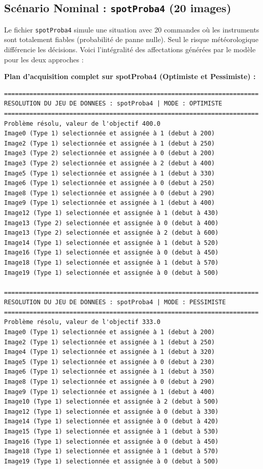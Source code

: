 \documentclass[8pt]{article}
\begin{document}
\subsection{Scénario Nominal : \texttt{spotProba4} (20 images)}

Le fichier \texttt{spotProba4} simule une situation avec 20 commandes où les instruments sont totalement fiables (probabilité de panne nulle). Seul le risque météorologique différencie les décisions. Voici l'intégralité des affectations générées par le modèle pour les deux approches :

\textbf{Plan d'acquisition complet sur spotProba4 (Optimiste et Pessimiste) :}
\begin{verbatim}
======================================================================
RESOLUTION DU JEU DE DONNEES : spotProba4 | MODE : OPTIMISTE
======================================================================
Problème résolu, valeur de l'objectif 400.0
Image0 (Type 1) selectionnée et assignée à 1 (debut à 200)
Image2 (Type 1) selectionnée et assignée à 1 (debut à 250)
Image3 (Type 2) selectionnée et assignée à 0 (debut à 200)
Image3 (Type 2) selectionnée et assignée à 2 (debut à 400)
Image5 (Type 1) selectionnée et assignée à 1 (debut à 330)
Image6 (Type 1) selectionnée et assignée à 0 (debut à 250)
Image8 (Type 1) selectionnée et assignée à 0 (debut à 290)
Image9 (Type 1) selectionnée et assignée à 1 (debut à 400)
Image12 (Type 1) selectionnée et assignée à 1 (debut à 430)
Image13 (Type 2) selectionnée et assignée à 0 (debut à 400)
Image13 (Type 2) selectionnée et assignée à 2 (debut à 600)
Image14 (Type 1) selectionnée et assignée à 1 (debut à 520)
Image16 (Type 1) selectionnée et assignée à 0 (debut à 450)
Image18 (Type 1) selectionnée et assignée à 1 (debut à 570)
Image19 (Type 1) selectionnée et assignée à 0 (debut à 500)

======================================================================
RESOLUTION DU JEU DE DONNEES : spotProba4 | MODE : PESSIMISTE
======================================================================
Problème résolu, valeur de l'objectif 333.0
Image0 (Type 1) selectionnée et assignée à 1 (debut à 200)
Image2 (Type 1) selectionnée et assignée à 1 (debut à 250)
Image4 (Type 1) selectionnée et assignée à 1 (debut à 320)
Image5 (Type 1) selectionnée et assignée à 0 (debut à 230)
Image6 (Type 1) selectionnée et assignée à 1 (debut à 350)
Image8 (Type 1) selectionnée et assignée à 0 (debut à 290)
Image9 (Type 1) selectionnée et assignée à 1 (debut à 400)
Image10 (Type 1) selectionnée et assignée à 2 (debut à 500)
Image12 (Type 1) selectionnée et assignée à 0 (debut à 330)
Image14 (Type 1) selectionnée et assignée à 0 (debut à 420)
Image15 (Type 1) selectionnée et assignée à 1 (debut à 530)
Image16 (Type 1) selectionnée et assignée à 0 (debut à 450)
Image18 (Type 1) selectionnée et assignée à 1 (debut à 570)
Image19 (Type 1) selectionnée et assignée à 0 (debut à 500)
\end{verbatim}
\end{document}
